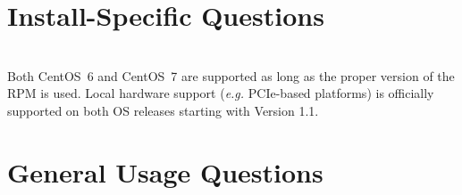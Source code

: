 \section{Install-Specific Questions}
\begin{description}[style=nextline]
\item[Does it matter what version of CentOS is used?]~\\
Both CentOS~6 and CentOS~7 are supported as long as the proper version of the RPM is used. Local hardware support (\textit{e.g.} PCIe-based platforms) is officially supported on both OS releases starting with Version 1.1.
\end{description}

\section{General Usage Questions}
